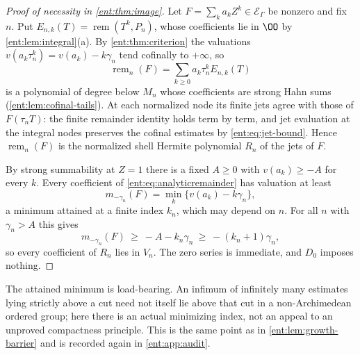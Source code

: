 \documentclass[11pt]{article}
\theoremstyle{plain}
\theoremstyle{plain}
\theoremstyle{plain}
\theoremstyle{definition}
\theoremstyle{definition}
\theoremstyle{definition}
\theoremstyle{definition}
\theoremstyle{remark}
\newcommand{\E}{\mathcal E_\Gamma}
\DeclareMathOperator{\remp}{rem}\DeclareMathOperator{\Res}{Res}
\begin{document}
\begin{proof}[Proof of necessity in \cref{ent:thm:image}]
Let $F=\sum_ka_kZ^k\in\E$ be nonzero and fix $n$. Put
$E_{n,k}(T)=\remp(T^k,P_n)$, whose coefficients lie in $\OO$ by
\cref{ent:lem:integral}(a). By \cref{ent:thm:criterion} the valuations
$v(a_k\tau_n^k)=v(a_k)-k\gamma_n$ tend cofinally to $+\infty$, so
\begin{equation}\label{ent:eq:analyticremainder}
 \remp_n(F)=\sum_{k\ge0}a_k\tau_n^kE_{n,k}(T)
\end{equation}
is a polynomial of degree below $M_n$ whose coefficients are strong Hahn sums
(\cref{ent:lem:cofinal-tails}). At each normalized node its finite jets agree
with those of $F(\tau_nT)$: the finite remainder identity holds term by term,
and jet evaluation at the integral nodes preserves the cofinal estimates by
\eqref{ent:eq:jet-bound}. Hence $\remp_n(F)$ is the normalized shell Hermite
polynomial $R_n$ of the jets of $F$.

By strong summability at $Z=1$ there is a fixed $A\ge0$ with $v(a_k)\ge-A$
for every $k$. Every coefficient of \eqref{ent:eq:analyticremainder} has
valuation at least
\[
 m_{-\gamma_n}(F)=\min_k\{v(a_k)-k\gamma_n\},
\]
a minimum attained at a finite index $k_n$, which may depend on $n$. For all
$n$ with $\gamma_n>A$ this gives
\[
 m_{-\gamma_n}(F)\ \ge\ -A-k_n\gamma_n\ \ge\ -(k_n+1)\gamma_n ,
\]
so every coefficient of $R_n$ lies in $V_n$. The zero series is immediate,
and $D_0$ imposes nothing.
\end{proof}

The attained minimum is load-bearing. An infimum of infinitely many estimates
lying strictly above a cut need not itself lie above that cut in a
non-Archimedean ordered group; here there is an actual minimizing index, not
an appeal to an unproved compactness principle. This is the same point as in
\cref{ent:lem:growth-barrier} and is recorded again in
\cref{ent:app:audit}.
\end{document}
